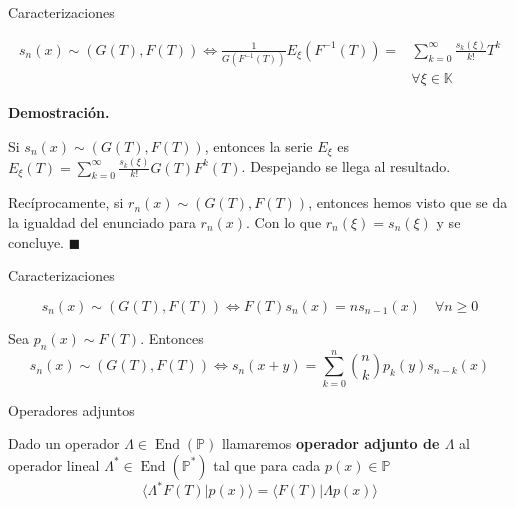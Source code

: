 \documentclass{beamer}
\newenvironment{teorema}[1][]{
  \begin{tcolorbox}[colback=darkred!10, colframe=darkred!90, title=Teorema\ #1, fonttitle=\bfseries]
}{
  \end{tcolorbox}
}
\newenvironment{definicion}[1][]{
  \begin{tcolorbox}[colback=red!10, colframe=red!80!black, title=Definición\ #1, fonttitle=\bfseries]
}{
  \end{tcolorbox}
}
\newenvironment{demo}{%
  \par\medskip\noindent\textbf{Demostración.}\hspace{0.5em}%
}{%
  \hfill$\blacksquare$\par\medskip%
}
\newcommand{\poly}{\mathbb{P}} %
\newcommand{\field}{\mathbb{K}} %
\DeclareMathOperator*{\End}{End} %
\begin{document}
  \begin{frame}{Caracterizaciones}
    \begin{teorema}[(función generadora)]
      \begin{align*}
        s_n(x) \sim (G(T), F(T)) \iff \frac{1}{G(F^{-1}(T))}E_{\xi} (F^{-1}(T)) = & \sum_{k=0}^\infty \frac{s_k(\xi)}{k!}T^k \\ 
        & \forall \xi \in \field
      \end{align*}
    \end{teorema}

    \begin{demo}
      Si $s_n(x) \sim (G(T), F(T))$, entonces la serie $E_{\xi}$ es\\
      \small{$\displaystyle E_{\xi}(T) = \sum_{k=0}^\infty \frac{s_k(\xi)}{k!}G(T)F^k(T)$}. Despejando se llega al resultado.

      Recíprocamente, si $r_n(x) \sim (G(T), F(T))$, entonces hemos visto que se da la igualdad del enunciado para $r_n(x)$. Con lo que $r_n(\xi) = s_n(\xi)$ y se concluye.
    \end{demo}
  \end{frame}

  \begin{frame}{Caracterizaciones}
    \begin{teorema}[(caracterización diferencial)]
      \begin{equation*}
        s_n(x) \sim (G(T), F(T)) \iff F(T)s_{n}(x) = ns_{n-1}(x) \quad \forall n \geq 0
      \end{equation*}
    \end{teorema}

    \begin{teorema}[(identidad de Sheffer)]
      Sea $p_n(x) \sim F(T)$. Entonces
      \begin{equation*}
        s_n(x) \sim (G(T), F(T)) \iff s_n (x+y) = \sum_{k=0}^n \binom{n}{k} p_k (y) s_{n-k}(x)
      \end{equation*}
    \end{teorema}
  \end{frame}

\begin{frame}{Operadores adjuntos}
  \begin{definicion}
    Dado un operador $\Lambda \in \End(\poly)$ llamaremos \textbf{operador adjunto de $\Lambda$} al operador lineal $\Lambda^* \in \End(\poly^*)$ tal que para cada $p(x) \in \poly$
    \begin{equation*}
        \langle \Lambda^* F(T) | p(x) \rangle = \langle F(T) | \Lambda p(x) \rangle
    \end{equation*}
  \end{definicion}
\end{frame}
\end{document}
